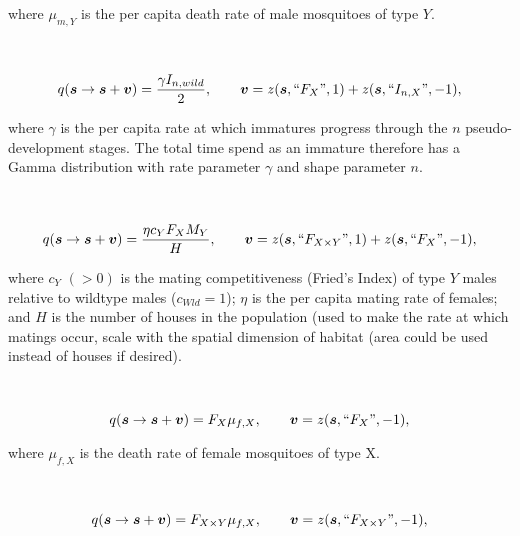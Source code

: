 \documentclass[]{article}  %
\begin{document}
\noindent where $\mu_{m, Y}$ is the per capita death rate of male mosquitoes of type $Y$.
\\
\\
\\
$$q(\boldsymbol{s} \rightarrow \boldsymbol{s} + \boldsymbol{v}) = \frac{ \gamma I_{n, wild}}{2}, \qquad \boldsymbol{v} = z(\boldsymbol{s}, \textup{``}F_X\textup{''} , 1) + z(\boldsymbol{s}, \textup{``} I_{n, X} \textup{''} , -1),$$

\noindent where $\gamma$ is the per capita rate at which immatures progress through the $n$ pseudo-development stages.  The total time spend as an immature therefore has a Gamma distribution with rate parameter $\gamma$ and shape parameter $n$.
\\
\\
\\
$$q(\boldsymbol{s} \rightarrow \boldsymbol{s} + \boldsymbol{v}) = \frac{\eta c_Y F_X M_Y}{H}, \qquad \boldsymbol{v} = z(\boldsymbol{s}, \textup{``}F_{X \times Y}\textup{''} , 1) + z(\boldsymbol{s}, \textup{``} F_X \textup{''} , -1),$$

\noindent where $c_Y$ $(> 0)$ is the mating competitiveness (Fried's Index) of type $Y$ males relative to wildtype males ($c_{Wld} = 1$); $\eta$ is the per capita mating rate of females; and $H$ is the number of houses in the population (used to make the rate at which matings occur, scale with the spatial dimension of habitat (area could be used instead of houses if desired).
\\
\\
\\
$$q(\boldsymbol{s} \rightarrow \boldsymbol{s} + \boldsymbol{v}) = F_{X} \mu_{f, X}, \qquad \boldsymbol{v} =  z(\boldsymbol{s}, \textup{``} F_{X} \textup{''} , -1),$$

\noindent where $\mu_{f, X}$ is the death rate of female mosquitoes of type X.
\\
\\
\\
$$q(\boldsymbol{s} \rightarrow \boldsymbol{s} + \boldsymbol{v}) = F_{X \times Y} \mu_{f, X}, \qquad \boldsymbol{v} =  z(\boldsymbol{s}, \textup{``} F_{X \times Y} \textup{''} , -1),$$
\end{document}
